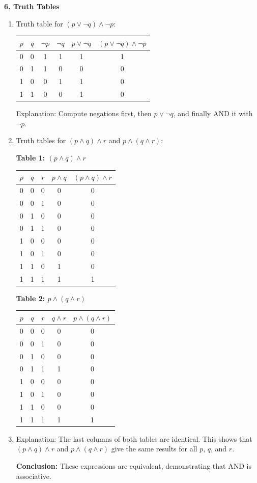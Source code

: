 \documentclass[12pt]{article}
\begin{document}
\textbf{6. Truth Tables}

\begin{enumerate}

\item[ (a) ] Truth table for $(p \lor \neg q) \land \neg p$:

\begin{center}
\begin{tabular}{|c|c|c|c|c|c|}
\hline
$p$ & $q$ & $\neg p$ & $\neg q$ & $p \lor \neg q$ & $(p \lor \neg q) \land \neg p$ \\
\hline
0 & 0 & 1 & 1 & 1 & 1 \\
0 & 1 & 1 & 0 & 0 & 0 \\
1 & 0 & 0 & 1 & 1 & 0 \\
1 & 1 & 0 & 0 & 1 & 0 \\
\hline
\end{tabular}
\end{center}

Explanation: Compute negations first, then $p \lor \neg q$, and finally AND it with $\neg p$.  

\item[ (b) ] Truth tables for $(p \land q) \land r$ and $p \land (q \land r)$:

\begin{center}
\textbf{Table 1: $(p \land q) \land r$}
\begin{tabular}{|c|c|c|c|c|}
\hline
$p$ & $q$ & $r$ & $p \land q$ & $(p \land q) \land r$ \\
\hline
0 & 0 & 0 & 0 & 0 \\
0 & 0 & 1 & 0 & 0 \\
0 & 1 & 0 & 0 & 0 \\
0 & 1 & 1 & 0 & 0 \\
1 & 0 & 0 & 0 & 0 \\
1 & 0 & 1 & 0 & 0 \\
1 & 1 & 0 & 1 & 0 \\
1 & 1 & 1 & 1 & 1 \\
\hline
\end{tabular}
\end{center}

\begin{center}
\textbf{Table 2: $p \land (q \land r)$}
\begin{tabular}{|c|c|c|c|c|}
\hline
$p$ & $q$ & $r$ & $q \land r$ & $p \land (q \land r)$ \\
\hline
0 & 0 & 0 & 0 & 0 \\
0 & 0 & 1 & 0 & 0 \\
0 & 1 & 0 & 0 & 0 \\
0 & 1 & 1 & 1 & 0 \\
1 & 0 & 0 & 0 & 0 \\
1 & 0 & 1 & 0 & 0 \\
1 & 1 & 0 & 0 & 0 \\
1 & 1 & 1 & 1 & 1 \\
\hline
\end{tabular}
\end{center}

\item[ (c) ] Explanation: The last columns of both tables are identical. This shows that $(p \land q) \land r$ and $p \land (q \land r)$ give the same results for all $p$, $q$, and $r$.  

\textbf{Conclusion:} These expressions are equivalent, demonstrating that AND is associative.

\end{enumerate}
\end{document}
